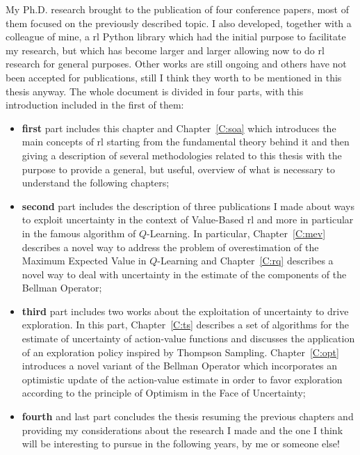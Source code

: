 My Ph.D. research brought to the publication of four conference papers, most of them focused on the previously described topic. I also developed, together with a colleague of mine, a \gls{rl} Python library which had the initial purpose to facilitate my research, but which has become larger and larger allowing now to do \gls{rl} research for general purposes. Other works are still ongoing and others have not been accepted for publications, still I think they worth to be mentioned in this thesis anyway. The whole document is divided in four parts, with this introduction included in the first of them:
\begin{itemize}
 \item \textbf{first} part includes this chapter and Chapter~\ref{C:soa} which introduces the main concepts of \gls{rl} starting from the fundamental theory behind it and then giving a description of several methodologies related to this thesis with the purpose to provide a general, but useful, overview of what is necessary to understand the following chapters;
 \item \textbf{second} part includes the description of three publications I made about ways to exploit uncertainty in the context of Value-Based \gls{rl} and more in particular in the famous algorithm of $Q$-Learning. In particular, Chapter~\ref{C:mev} describes a novel way to address the problem of overestimation of the Maximum Expected Value in $Q$-Learning and Chapter~\ref{C:rq} describes a novel way to deal with uncertainty in the estimate of the components of the Bellman Operator;
 \item \textbf{third} part includes two works about the exploitation of uncertainty to drive exploration. In this part, Chapter~\ref{C:ts} describes a set of algorithms for the estimate of uncertainty of action-value functions and discusses the application of an exploration policy inspired by Thompson Sampling. Chapter~\ref{C:opt} introduces a novel variant of the Bellman Operator which incorporates an optimistic update of the action-value estimate in order to favor exploration according to the principle of Optimism in the Face of Uncertainty;
 \item \textbf{fourth} and last part concludes the thesis resuming the previous chapters and providing my considerations about the research I made and the one I think will be interesting to pursue in the following years, by me or someone else!
\end{itemize}
